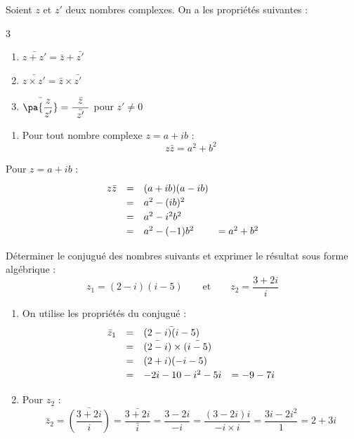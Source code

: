 \begin{prop}
	Soient $z$ et $z'$ deux nombres complexes. On a les propriétés suivantes :
	\begin{multicols}{3}
		\begin{enumerate}
			\item $\bar{z + z'} = \bar{z} + \bar{z'}$
			\item $\bar{z \times z'} = \bar{z} \times \bar{z'}$
			\item $\bar{\pa{\dfrac{z}{z'}}} = \dfrac{\phantom{x}\bar{z}\phantom{x}}{\bar{z'}}$ pour $z' \neq 0$
		\end{enumerate}
	\end{multicols}
	\begin{enumerate}[start=4]
		\item Pour tout nombre complexe $z = a + ib$ :
		      \[
			      z\bar{z} = a^2 + b^2
		      \]
	\end{enumerate}
\end{prop}

\begin{demo}
	Pour $z = a + ib$ :
	\[
		\def\arraystretch{1.2}
		\begin{array}{rcll}
			z\bar{z} & = & (a + ib)(a - ib) &             \\
			         & = & a^2 - (ib)^2     &             \\
			         & = & a^2 - i^2b^2     &             \\
			         & = & a^2 - (-1)b^2    & = a^2 + b^2
		\end{array}
	\]
\end{demo}

\begin{methode}
	Déterminer le conjugué des nombres suivants et exprimer le résultat sous forme algébrique :
	\[
		z_1 = (2 - i)(i - 5) \qquad \text{et} \qquad z_2 = \frac{3 + 2i}{i}
	\]

	\begin{correction}
		\nline
		\begin{enumerate}
			\item On utilise les propriétés du conjugué :
			      \[
				      \def\arraystretch{1.2}
				      \begin{array}{rcll}
					      \bar{z}_1 & = & \bar{(2 - i)(i - 5)}               &           \\
					                & = & \bar{(2 - i)} \times \bar{(i - 5)} &           \\
					                & = & (2 + i)(-i - 5)                    &           \\
					                & = & -2i - 10 - i^2 - 5i                & = -9 - 7i
				      \end{array}
			      \]

			\item Pour $z_2$ :
			      \[
				      \bar{z}_2 = \bar{\left(\frac{3 + 2i}{i}\right)} = \frac{\bar{3 + 2i}}{\bar{i}} = \frac{3 - 2i}{-i} = \frac{(3 - 2i)i}{-i \times i} = \frac{3i - 2i^2}{1} = 2 + 3i
			      \]

		\end{enumerate}
	\end{correction}
\end{methode}

